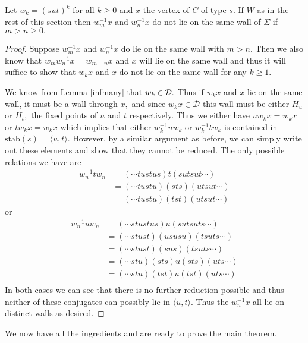 \documentclass[class=book, crop=false,12 pt]{standalone}
\begin{document}
\begin{lemma}
	\label{samewall}
	Let $w_k=(sut)^k$ for all $k\ge 0$ and $x$ the vertex of $C$ of type $s.$ If $W$ as in the rest of this section then $w_m^{-1}x$ and $w_n^{-1}x$ do not lie on the same wall of $\Sigma$ if $m>n\ge 0.$
\end{lemma}
\begin{proof}
	Suppose $w^{-1}_mx$ and $w^{-1}_nx$ do lie on the same wall with $m>n.$ Then we also know that $w_mw^{-1}_nx=w_{m-n}x$ and $x$ will lie on the same wall and thus it will suffice to show that $w_kx$ and $x$ do not lie on the same wall for any $k\ge 1.$
	
	We know from Lemma \ref{infmany} that $w_k\in \mathcal{D}.$ Thus if $w_kx$ and $x$ lie on the same wall, it must be a wall through $x,$ and since $w_kx\in \mathcal{D}$ this wall must be either $H_u$ or $H_t,$ the fixed points of $u$ and $t$ respectively. Thus we either have $uw_kx=w_kx$ or $tw_kx=w_kx$ which implies that either $w_k^{-1}uw_k$ or $w_k^{-1}tw_k$ is contained in $\mathrm{stab}(s)=\langle u,t \rangle.$ However, by a similar argument as before, we can simply write out these elements and show that they cannot be reduced. The only possible relations we have are
\begin{align*}
	w_n^{-1}tw_n&=(\cdots tustus)t(sutsut\cdots)\\
		    &=(\cdots tustu)(sts)(utsut\cdots)\\
		    &=(\cdots tustu)(tst)(utsut\cdots)
\end{align*}
or
\begin{align*}
	w_n^{-1}uw_n&=(\cdots stustus)u(sutsuts\cdots)\\
		    &=(\cdots stust)(ususu)(tsuts\cdots)\\
		    &=(\cdots stust)(sus)(tsuts\cdots)\\
		    &=(\cdots stu)(sts)u(sts)(uts\cdots)\\
		    &=(\cdots stu)(tst)u(tst)(uts\cdots)\\
\end{align*}
In both cases we can see that there is no further reduction possible and thus neither of these conjugates can possibly lie in $\langle u,t \rangle.$ Thus the $w^{-1}_nx$ all lie on distinct walls as desired.
\end{proof}

We now have all the ingredients and are ready to prove the main theorem.
\end{document}
